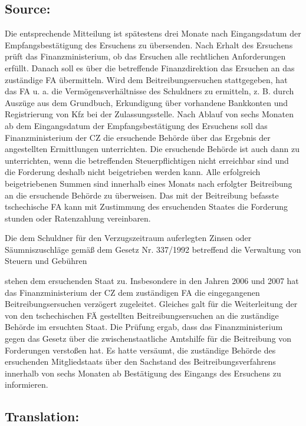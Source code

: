 \documentclass[10pt]{article}
\begin{document}
\subsection*{Source:}

Die entsprechende Mitteilung ist spätestens drei Monate nach Eingangsdatum der Empfangsbestätigung des Ersuchens zu übersenden.
Nach Erhalt des Ersuchens prüft das Finanzministerium, ob das Ersuchen alle rechtlichen Anforderungen erfüllt.
Danach soll es über die betreffende Finanzdirektion das Ersuchen an das zuständige FA übermitteln. Wird dem Beitreibungsersuchen stattgegeben, hat das FA u. a. die Vermögensverhältnisse des Schuldners zu ermitteln, z. B. durch Auszüge aus dem Grundbuch, Erkundigung über vorhandene Bankkonten und Registrierung von Kfz bei der Zulassungsstelle.
Nach Ablauf von sechs Monaten ab dem Eingangsdatum der Empfangsbestätigung des Ersuchens soll das Finanzministerium der CZ die ersuchende Behörde über das Ergebnis der angestellten Ermittlungen unterrichten.
Die ersuchende Behörde ist auch dann zu unterrichten, wenn die betreffenden Steuerpflichtigen nicht erreichbar sind und die Forderung deshalb nicht beigetrieben werden kann.
Alle erfolgreich beigetriebenen Summen sind innerhalb eines Monats nach erfolgter Beitreibung an die ersuchende Behörde zu überweisen.
Das mit der Beitreibung befasste tschechische FA kann mit Zustimmung des ersuchenden Staates die Forderung stunden oder Ratenzahlung vereinbaren.


Die dem Schuldner für den Verzugszeitraum auferlegten Zinsen oder Säumniszuschläge gemäß dem Gesetz Nr. 337/1992 betreffend die Verwaltung von Steuern und Gebühren

stehen dem ersuchenden Staat zu.
Insbesondere in den Jahren 2006 und 2007 hat das Finanzministerium der CZ dem zuständigen FA die eingegangenen Beitreibungsersuchen verzögert zugeleitet.
Gleiches galt für die Weiterleitung der von den tschechischen FÄ gestellten Beitreibungsersuchen an die zuständige Behörde im ersuchten Staat.
Die Prüfung ergab, dass das Finanzministerium gegen das Gesetz über die zwischenstaatliche Amtshilfe für die Beitreibung von Forderungen verstoßen hat. Es hatte versäumt, die zuständige Behörde des ersuchenden Mitgliedstaats über den Sachstand des Beitreibungsverfahrens innerhalb von sechs Monaten ab Bestätigung des Eingangs des Ersuchens zu informieren.


\pagebreak

\subsection*{Translation:}
\end{document}
